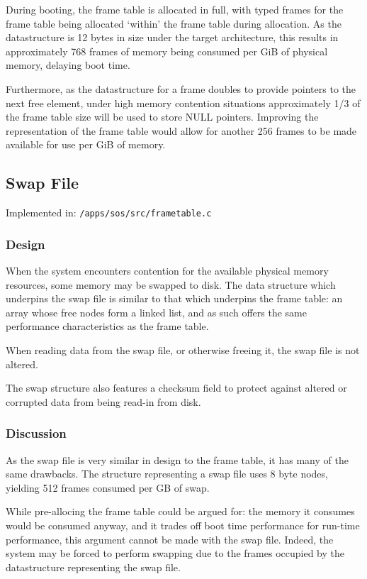 \documentclass[a4paper,12pt]{article}
\begin{document}
During booting, the frame table is allocated in full, with typed frames for
the frame table being allocated `within' the frame table during allocation.
As the datastructure is 12 bytes in size under the target architecture, this
results in approximately 768 frames of memory being consumed per GiB of
physical memory, delaying boot time.

Furthermore, as the datastructure for a frame doubles to provide pointers to
the next free element, under high memory contention situations approximately
1/3 of the frame table size will be used to store NULL pointers.  Improving
the representation of the frame table would allow for another 256 frames to be
made available for use per GiB of memory.

\subsection{Swap File}
Implemented in: \texttt{/apps/sos/src/frametable.c}

\subsubsection{Design}
When the system encounters contention for the available physical memory
resources, some memory may be swapped to disk.  The data structure which
underpins the swap file is similar to that which underpins the frame table: an
array whose free nodes form a linked list, and as such offers the same
performance characteristics as the frame table.

When reading data from the swap file, or otherwise freeing it, the swap file
is not altered.

The swap structure also features a checksum field to protect against altered
or corrupted data from being read-in from disk.

\subsubsection{Discussion}
As the swap file is very similar in design to the frame table, it has many of
the same drawbacks.  The structure representing a swap file uses 8 byte nodes,
yielding 512 frames consumed per GB of swap.

While pre-allocing the frame table could be argued for: the memory it consumes
would be consumed anyway, and it trades off boot time performance for run-time
performance, this argument cannot be made with the swap file.  Indeed, the
system may be forced to perform swapping due to the frames occupied by the
datastructure representing the swap file.
\end{document}
